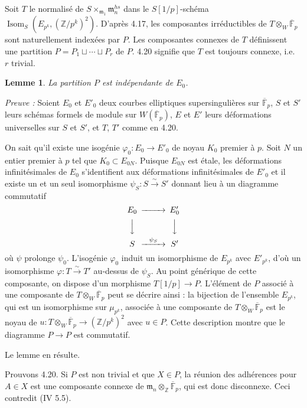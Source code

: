 \documentclass[10pt,a4paper]{amsart}
\theoremstyle{plain}
\newtheorem{lemma}[theorem]{Lemme}
\theoremstyle{definition}
\DeclareMathOperator{\Isom}{Isom}
\newcommand{\m}{\mathfrak{m}}
\newcommand{\FF}{\mathbb{F}}
\newcommand{\ZZ}{\mathbb{Z}}
\begin{document}
Soit $T$ le normalis\'e de $S \times_{\m_1} \m_n^{hs}$ dans le $S[1/p]$-sch\'ema $\Isom_S(E_{p^k}, (\ZZ/p^k)^2)$. D'apr\`es 4.17, les composantes irr\'eductibles de $T \otimes_W \overline{\FF}_p$ sont naturellement index\'ees par $P$. Les composantes connexes de $T$ d\'efinissent une partition $P = P_1 \sqcup \cdots \sqcup P_r$ de $P$. 4.20 signifie que $T$ est toujours connexe, i.e.\ $r$ trivial.

\setcounter{theorem}{20}
\begin{lemma}
La partition $P$ est ind\'ependante de $E_0$.
\end{lemma}

\noindent\emph{Preuve :} Soient $E_0$ et $E'_0$ deux courbes elliptiques supersinguli\`eres sur $\overline{\FF}_p$, $S$ et $S'$ leurs sch\'emas formels de module sur $W(\overline{\FF}_p)$, $E$ et $E'$ leurs d\'eformations universelles sur $S$ et $S'$, et $T$, $T'$ comme en 4.20.

On sait qu'il existe une isog\'enie $\varphi_0 : E_0 \to E'_0$ de noyau $K_0$ premier \`a $p$. Soit $N$ un entier premier \`a $p$ tel que $K_0 \subset E_{0N}$. Puisque $E_{0N}$ est \'etale, les d\'eformations infinit\'esimales de $E_0$ s'identifient aux d\'eformations infinit\'esimales de $E'_0$ et il existe un et un seul isomorphisme $\psi_S : S \xrightarrow{\sim} S'$ donnant lieu \`a un diagramme commutatif
\[
\begin{CD}
E_0 @>>> E'_0 \\
@VVV @VVV \\
S @>{\psi_S}>> S'
\end{CD}
\]
o\`u $\psi$ prolonge $\psi_0$. L'isog\'enie $\varphi_0$ induit un isomorphisme de $E_{p^k}$ avec $E'_{p^k}$, d'o\`u un isomorphisme $\varphi : T \xrightarrow{\sim} T'$ au-dessus de $\psi_S$. Au point g\'en\'erique de cette composante, on dispose d'un morphisme $T[1/p] \to P$. L'\'el\'ement de $P$ associ\'e \`a une composante de $T \otimes_W \overline{\FF}_p$ peut se d\'ecrire ainsi : la bijection de l'ensemble $E_{p^k}$, qui est un isomorphisme sur $\mu_{p^k}$, associ\'ee \`a une composante de $T \otimes_W \overline{\FF}_p$ est le noyau de $u : T \otimes_W \overline{\FF}_p \to (\ZZ/p^k)^2$ avec $u \in P$. Cette description montre que le diagramme $P \to P$ est commutatif.

Le lemme en r\'esulte.

Prouvons 4.20. Si $P$ est non trivial et que $X \in P$, la r\'eunion des adh\'erences pour $A \in X$ est une composante connexe de $\m_n \otimes_\ZZ \overline{\FF}_p$, qui est donc disconnexe. Ceci contredit (IV 5.5).
\end{document}
